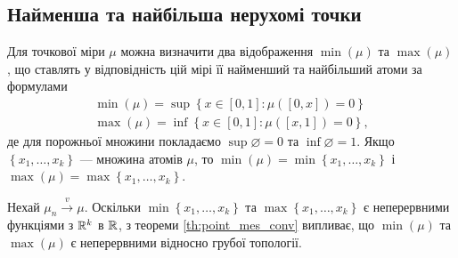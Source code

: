 \subsection{Найменша та найбільша нерухомі точки}
Для точкової міри $\mu$ можна визначити два відображення
$\min(\mu)$ та $\max(\mu)$, що ставлять у відповідність
цій мірі її найменший та найбільший атоми за формулами
\begin{gather}
    \min(\mu) = \sup \left\{x\in[0,1] :\mu([0, x]) = 0 \right\} \\
    \max(\mu) = \inf \left\{x\in[0,1] :\mu([x, 1]) = 0 \right\},
\end{gather}
де для порожньої множини
покладаємо $\sup \varnothing = 0$ та $\inf \varnothing = 1$.
Якщо $\left\{x_1,\dots,x_k \right\}$ --- множина атомів $\mu$,
то  
$\min(\mu) = \min\left\{x_1,\dots,x_k \right\}$ і 
$\max(\mu) = \max\left\{x_1,\dots,x_k \right\}$.

Нехай $\mu_n \overset{v}{\longrightarrow} \mu$.
Оскільки $\min\left\{x_1,\dots,x_k \right\}$ та
$\max\left\{x_1,\dots,x_k \right\}$ є неперервними функціями з $\mathbb{R}^k$ в $\mathbb{R}$, 
з теореми \ref{th:point_mes_conv}
випливає, що $\min(\mu)$ та $\max(\mu)$ 
є неперервними відносно грубої топології.


